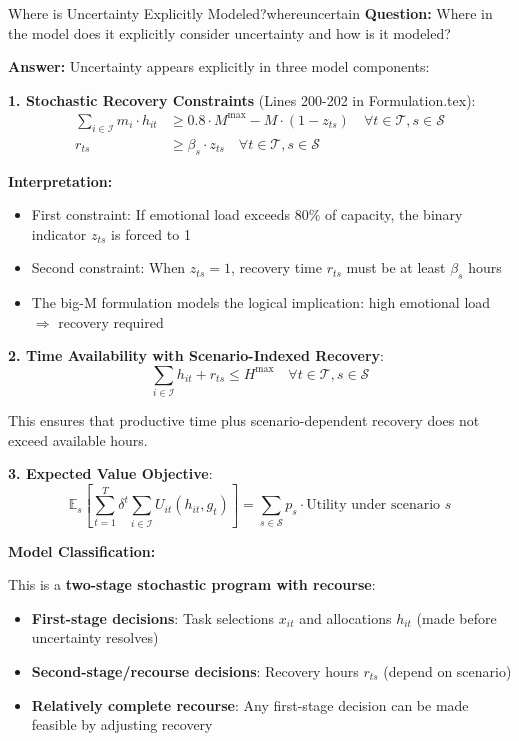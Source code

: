 \documentclass[11pt,a4paper]{article}
\newcommand{\E}{\mathbb{E}}
\begin{document}
\begin{questionbox}{Where is Uncertainty Explicitly Modeled?}{whereuncertain}
\textbf{Question:} Where in the model does it explicitly consider uncertainty and how is it modeled?

\textbf{Answer:} Uncertainty appears explicitly in three model components:

\textbf{1. Stochastic Recovery Constraints} (Lines 200-202 in Formulation.tex):
\begin{align}
\sum_{i \in \mathcal{I}} m_i \cdot h_{it} &\geq 0.8 \cdot M^{\max} - M \cdot (1 - z_{ts}) \quad \forall t \in \mathcal{T}, s \in \mathcal{S} \\
r_{ts} &\geq \beta_s \cdot z_{ts} \quad \forall t \in \mathcal{T}, s \in \mathcal{S}
\end{align}

\textbf{Interpretation:}
\begin{itemize}
    \item First constraint: If emotional load exceeds 80\% of capacity, the binary indicator $z_{ts}$ is forced to 1
    \item Second constraint: When $z_{ts} = 1$, recovery time $r_{ts}$ must be at least $\beta_s$ hours
    \item The big-M formulation models the logical implication: high emotional load $\Rightarrow$ recovery required
\end{itemize}

\textbf{2. Time Availability with Scenario-Indexed Recovery}:
$$\sum_{i \in \mathcal{I}} h_{it} + r_{ts} \leq H^{\max} \quad \forall t \in \mathcal{T}, s \in \mathcal{S}$$

This ensures that productive time plus scenario-dependent recovery does not exceed available hours.

\textbf{3. Expected Value Objective}:
$$\E_s \left[ \sum_{t=1}^T \delta^t \sum_{i \in \mathcal{I}} U_{it}(h_{it}, g_t) \right] = \sum_{s \in \mathcal{S}} p_s \cdot \text{Utility under scenario } s$$

\textbf{Model Classification:}

This is a \textbf{two-stage stochastic program with recourse}:
\begin{itemize}
    \item \textbf{First-stage decisions}: Task selections $x_{it}$ and allocations $h_{it}$ (made before uncertainty resolves)
    \item \textbf{Second-stage/recourse decisions}: Recovery hours $r_{ts}$ (depend on scenario)
    \item \textbf{Relatively complete recourse}: Any first-stage decision can be made feasible by adjusting recovery
\end{itemize}
\end{questionbox}
\end{document}
